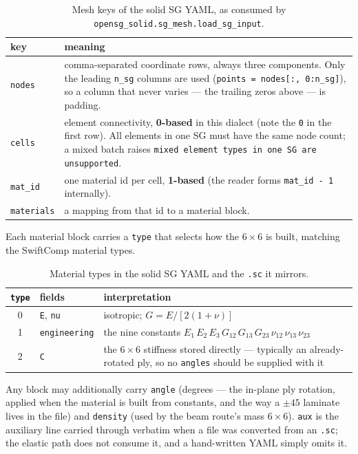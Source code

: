 \begin{table}[htbp]
\centering
\small
\caption{Mesh keys of the solid SG YAML, as consumed by
\texttt{opensg\_solid.sg\_mesh.load\_sg\_input}.}
\label{tab:input-solid-keys}
\begin{tabular}{@{}lp{10.4cm}@{}}
\toprule
key & meaning \\
\midrule
\texttt{nodes} & comma-separated coordinate rows, always three components.
  Only the leading \texttt{n\_sg} columns are used
  (\texttt{points = nodes[:, 0:n\_sg]}), so a column that never varies --- the
  trailing zeros above --- is padding. \\
\texttt{cells} & element connectivity, \textbf{0-based} in this dialect (note
  the \texttt{0} in the first row). All elements in one SG must have the same
  node count; a mixed batch raises \texttt{mixed element types in one SG are
  unsupported}. \\
\texttt{mat\_id} & one material id per cell, \textbf{1-based} (the reader forms
  \texttt{mat\_id - 1} internally). \\
\texttt{materials} & a mapping from that id to a material block. \\
\bottomrule
\end{tabular}
\end{table}

Each material block carries a \texttt{type} that selects how the $6\times6$ is
built, matching the SwiftComp material types.

\begin{table}[htbp]
\centering
\small
\caption{Material types in the solid SG YAML and the \texttt{.sc} it mirrors.}
\label{tab:input-mattypes}
\begin{tabular}{@{}clp{7.6cm}@{}}
\toprule
\texttt{type} & fields & interpretation \\
\midrule
0 & \texttt{E}, \texttt{nu} & isotropic; $G = E/[2(1+\nu)]$ \\
1 & \texttt{engineering} & the nine constants
  $E_1\,E_2\,E_3\,G_{12}\,G_{13}\,G_{23}\,\nu_{12}\,\nu_{13}\,\nu_{23}$ \\
2 & \texttt{C} & the $6\times6$ stiffness stored directly --- typically an
  already-rotated ply, so no \texttt{angles} should be supplied with it \\
\bottomrule
\end{tabular}
\end{table}

Any block may additionally carry \texttt{angle} (degrees --- the in-plane ply
rotation, applied when the material is built from constants, and the way a
$\pm45$ laminate lives in the file) and \texttt{density} (used by the beam
route's mass $6\times6$). \texttt{aux} is the auxiliary line carried through
verbatim when a file was converted from an \texttt{.sc}; the elastic path does
not consume it, and a hand-written YAML simply omits it.

